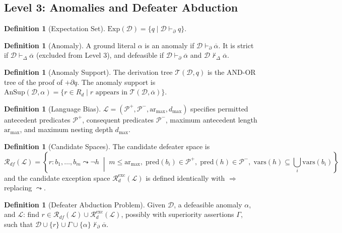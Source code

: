 \documentclass{article}
\theoremstyle{definition}
\newtheorem{definition}[theorem]{Definition}
\newcommand{\D}{\mathcal{D}}
\newcommand{\La}{\mathcal{L}}
\newcommand{\Rd}{R_d}
\newcommand{\Rdfspace}{\mathcal{R}_{df}}
\newcommand{\Rdexcspace}{\mathcal{R}_{d}^{\mathrm{exc}}}
\newcommand{\pred}{\mathrm{pred}}
\newcommand{\AnSup}{\mathrm{AnSup}}
\newcommand{\Exp}{\mathrm{Exp}}
\newcommand{\pDelta}{\vdash_{\Delta}}
\newcommand{\pPartial}{\vdash_{\partial}}
\newcommand{\defto}{\Rightarrow}
\newcommand{\defeatto}{\leadsto}
\newcommand{\comp}[1]{\overline{#1}}
\begin{document}
\subsection{Level 3: Anomalies and Defeater Abduction}\label{subsec:level3detail}

\begin{definition}[Expectation Set]\label{def:expectation}
$\Exp(\D) = \{q \mid \D \pPartial q\}$.
\end{definition}

\begin{definition}[Anomaly]\label{def:anomclass}
A ground literal $\alpha$ is an anomaly if $\D \pPartial \comp{\alpha}$. It is strict if $\D \pDelta \comp{\alpha}$ (excluded from Level 3), and defeasible if $\D \pPartial \comp{\alpha}$ and $\D \not\pDelta \comp{\alpha}$.
\end{definition}

\begin{definition}[Anomaly Support]\label{def:ansup}
The derivation tree $\mathcal{T}(\D, q)$ is the AND-OR tree of the proof of $+\partial q$. The anomaly support is $\AnSup(\D, \alpha) = \{r \in \Rd \mid r \text{ appears in } \mathcal{T}(\D, \comp{\alpha})\}$.
\end{definition}

\begin{definition}[Language Bias]\label{def:langbias}
$\La = (\mathcal{P}^+, \mathcal{P}^-, \mathrm{ar}_{\max}, d_{\max})$ specifies permitted antecedent predicates $\mathcal{P}^+$, consequent predicates $\mathcal{P}^-$, maximum antecedent length $\mathrm{ar}_{\max}$, and maximum nesting depth $d_{\max}$.
\end{definition}

\begin{definition}[Candidate Spaces]\label{def:candspace}
The candidate defeater space is
\[
    \Rdfspace(\La) = \left\{r\colon b_1, \ldots, b_m \defeatto \neg h \;\middle|\;
    m \leq \mathrm{ar}_{\max},\;
    \pred(b_i) \in \mathcal{P}^+,\;
    \pred(h) \in \mathcal{P}^-,\;
    \mathrm{vars}(h) \subseteq \textstyle\bigcup_i \mathrm{vars}(b_i)
    \right\}
\]
and the candidate exception space $\Rdexcspace(\La)$ is defined identically with $\defto$ replacing $\defeatto$.
\end{definition}

\begin{definition}[Defeater Abduction Problem]\label{def:dap}
Given $\D$, a defeasible anomaly $\alpha$, and $\La$: find $r \in \Rdfspace(\La) \cup \Rdexcspace(\La)$, possibly with superiority assertions $\Gamma$, such that $\D \cup \{r\} \cup \Gamma \cup \{\alpha\} \not\pPartial \comp{\alpha}$.
\end{definition}
\end{document}
